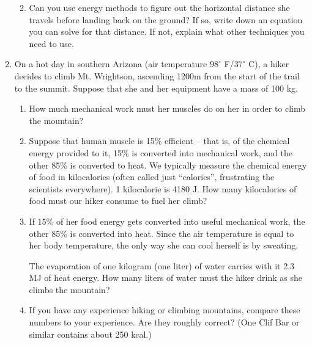 \documentclass[12pt]{article}
\begin{document}
\begin{enumerate}
\begin{enumerate}
\vspace{2in}

\item Can you use energy methods to figure out the horizontal distance she travels before landing back
on the ground? If so, write down an equation you can solve for that distance. If not, explain what other
techniques you need to use.
\end{enumerate}
\newpage




\item On a hot day in southern Arizona (air temperature $98^\circ$ F/$37^\circ$ C), a hiker decides to climb Mt. Wrightson, ascending 1200m from the start of the trail to the summit.
Suppose that she and her equipment have a mass of 100 kg.

\begin{enumerate}

\item How much mechanical work must her muscles do on her in order to climb the mountain?

\vspace{1in}

\item Suppose that human muscle is 15\% efficient -- that is, of the chemical energy provided to it, 15\% is converted into
mechanical work, and the other 85\% is converted to heat. We typically measure the chemical energy of food in kilocalories
(often called just ``calories'', frustrating the scientists everywhere). 1 kilocalorie is 4180 J. How many kilocalories of food
must our hiker consume to fuel her climb?

\vspace{2in}

\item If 15\% of her food energy gets converted into useful mechanical work, the other 85\% is converted into heat. Since the air temperature is
equal to her body temperature, the only way she can cool herself is by sweating.

The evaporation of one kilogram (one liter) of water carries with it 2.3 MJ of heat energy. How many liters of water must the
hiker drink as she climbs the mountain?

\vspace{2in}

\item If you have any experience hiking or climbing mountains, compare these numbers to your experience. Are they roughly correct? (One
Clif Bar or similar contains about 250 kcal.)

\end{enumerate}
\end{enumerate}
\end{document}
